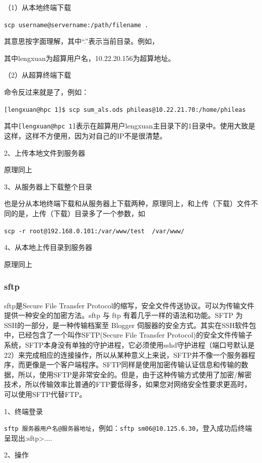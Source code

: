 {（1）从本地终端下载

\verb*|scp username@servername:/path/filename .|

其意思按字面理解，其中“.”表示当前目录。例如，
其中lengxuan为超算用户名，10.22.20.156为超算地址。


（2）从超算终端下载

命令反过来就是了，例如：

\verb*|[lengxuan@hpc 1]$ scp sum_als.ods phileas@10.22.21.70:/home/phileas|

其中\verb*|[lengxuan@hpc 1]|表示在超算用户lengxuan主目录下的1目录中。使用大致是这样，这样不方便用，因为对自己的IP不是很清楚。

2、上传本地文件到服务器

原理同上

3、从服务器上下载整个目录

也是分从本地终端下载和从服务器上下载两种，原理同上，和上传（下载）文件不同的是，上传（下载）目录多了一个参数，如

\verb*|scp -r root@192.168.0.101:/var/www/test  /var/www/  |

4、从本地上传目录到服务器

原理同上



\subsubsection{sftp}
sftp是Secure File Transfer Protocol的缩写，安全文件传送协议。可以为传输文件提供一种安全的加密方法。sftp 与 ftp 有着几乎一样的语法和功能。SFTP 为 SSH的一部分，是一种传输档案至 Blogger 伺服器的安全方式。其实在SSH软件包中，已经包含了一个叫作SFTP(Secure File Transfer Protocol)的安全文件传输子系统，SFTP本身没有单独的守护进程，它必须使用sshd守护进程（端口号默认是22）来完成相应的连接操作，所以从某种意义上来说，SFTP并不像一个服务器程序，而更像是一个客户端程序。SFTP同样是使用加密传输认证信息和传输的数据，所以，使用SFTP是非常安全的。但是，由于这种传输方式使用了加密/解密技术，所以传输效率比普通的FTP要低得多，如果您对网络安全性要求更高时，可以使用SFTP代替FTP。

1、终端登录

\verb|sftp 服务器用户名@服务器地址|，例如：\verb|sftp sm06@10.125.6.30|，登入成功后终端呈现出:sftp>....

2、操作

}
